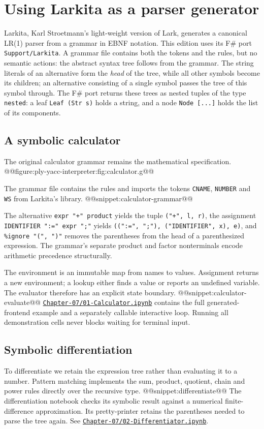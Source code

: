 \chapter{Using Larkita as a parser generator \label{chapter:ply}}
Larkita, Karl Stroetmann's light-weight version of Lark, generates a canonical LR(1) parser from a grammar in EBNF notation.
This edition uses its F\# port \texttt{Support/Larkita}.
A grammar file contains both the tokens and the rules, but no semantic actions: the abstract syntax tree follows from the grammar.
The string literals of an alternative form the \emph{head} of the tree, while all other symbols become its children; an alternative consisting of a single symbol passes the tree of this symbol through.
The F\# port returns these trees as nested tuples of the type \texttt{nested}: a leaf \texttt{Leaf (Str s)} holds a string, and a node \texttt{Node [...]} holds the list of its components.

\section{A symbolic calculator}
The original calculator grammar remains the mathematical specification.
@@figure:ply-yacc-interpreter:fig:calculator.g@@

The grammar file contains the rules and imports the tokens \texttt{CNAME}, \texttt{NUMBER} and \texttt{WS} from Larkita's library.
@@snippet:calculator-grammar@@

The alternative \texttt{expr "+" product} yields the tuple \texttt{("+", l, r)}, the assignment \texttt{IDENTIFIER ":=" expr ";"} yields \texttt{((":=", ";"), ("IDENTIFIER", x), e)}, and \texttt{\%ignore "(", ")"} removes the parentheses from the head of a parenthesized expression.
The grammar's separate product and factor nonterminals encode arithmetic precedence structurally.

The environment is an immutable map from names to values.
Assignment returns a new environment; a lookup either finds a value or reports an undefined variable.
The evaluator therefore has an explicit state boundary.
@@snippet:calculator-evaluate@@
\href{../../Chapter-07/01-Calculator.ipynb}{\nolinkurl{Chapter-07/01-Calculator.ipynb}} contains the full generated-frontend example and a separately callable interactive loop.
Running all demonstration cells never blocks waiting for terminal input.

\section{Symbolic differentiation}
To differentiate we retain the expression tree rather than evaluating it to a number.
Pattern matching implements the sum, product, quotient, chain and power rules directly over the recursive type.
@@snippet:differentiate@@
The differentiation notebook checks its symbolic result against a numerical finite-difference approximation.
Its pretty-printer retains the parentheses needed to parse the tree again.
See \href{../../Chapter-07/02-Differentiator.ipynb}{\nolinkurl{Chapter-07/02-Differentiator.ipynb}}.

